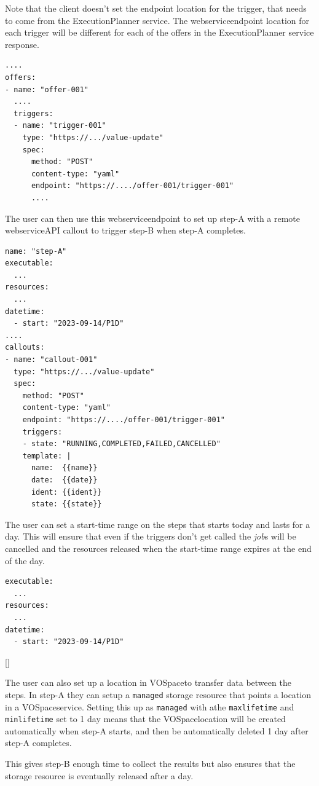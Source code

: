 \documentclass[11pt,a4paper]{ivoa}
\newcommand{\webservice} {webservice}
\newcommand{\vospace} {VOSpace}
\newcommand{\execplanner} {ExecutionPlanner}
\newcommand{\codeword}[1] {\texttt{#1}}
\newcommand{\job} {\textit{job}}
\begin{document}
Note that the client doesn't set the endpoint location for the trigger, that needs to
come from the \execplanner{} service.
The \webservice endpoint location for each trigger will be different for each of the
offers in the \execplanner{} service response.

\begin{lstlisting}[]
....
offers:
- name: "offer-001"
  ....
  triggers:
  - name: "trigger-001"
    type: "https://.../value-update"
    spec:
      method: "POST"
      content-type: "yaml"
      endpoint: "https://..../offer-001/trigger-001"
      ....
\end{lstlisting}

The user can then use this \webservice endpoint to set up step-A with a
remote \webservice API callout to trigger step-B when step-A completes.

\begin{lstlisting}[]
name: "step-A"
executable:
  ...
resources:
  ...
datetime:
  - start: "2023-09-14/P1D"
....
callouts:
- name: "callout-001"
  type: "https://.../value-update"
  spec:
    method: "POST"
    content-type: "yaml"
    endpoint: "https://..../offer-001/trigger-001"
    triggers:
    - state: "RUNNING,COMPLETED,FAILED,CANCELLED"
    template: |
      name:  {{name}}
      date:  {{date}}
      ident: {{ident}}
      state: {{state}}
\end{lstlisting}

The user can set a start-time range on the steps that starts today and lasts for a day.
This will ensure that even if the triggers don't get called the \job{}s will
be cancelled and the resources released when the start-time range expires at the end of the day.

\begin{lstlisting}[]
executable:
  ...
resources:
  ...
datetime:
  - start: "2023-09-14/P1D"
\end{lstlisting}[]

The user can also set up a location in \vospace to transfer data between the steps.
In step-A they can setup a \codeword{managed} storage resource that points a location
in a \vospace service. Setting this up as \codeword{managed} with athe \codeword{maxlifetime}
and \codeword{minlifetime} set to 1 day means that the \vospace location will be created
automatically when step-A starts, and then be automatically deleted 1 day after step-A completes.

This gives step-B enough time to collect the results but also ensures that the storage resource
is eventually released after a day.
\end{document}
